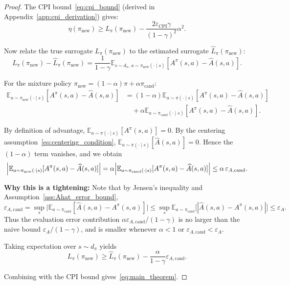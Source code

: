 \documentclass{article}
\theoremstyle{plain}
\theoremstyle{definition}
\theoremstyle{remark}
\newcommand{\E}{\mathbb{E}}
\begin{document}
\begin{proof}
The CPI bound~\eqref{eq:cpi_bound} (derived in Appendix~\ref{app:cpi_derivation}) gives:
\[
\eta(\pi_{\mathrm{new}}) \ge L_\pi(\pi_{\mathrm{new}}) - \frac{2\varepsilon_{\mathrm{CPI}}\gamma}{(1-\gamma)^2}\alpha^2.
\]

Now relate the true surrogate $L_\pi(\pi_{\mathrm{new}})$ to the estimated surrogate $\widehat{L}_\pi(\pi_{\mathrm{new}})$:
\[
L_\pi(\pi_{\mathrm{new}}) - \widehat{L}_\pi(\pi_{\mathrm{new}})
=
\frac{1}{1-\gamma}\E_{s\sim d_\pi,\, a\sim\pi_{\mathrm{new}}(\cdot\mid s)}\!\left[A^\pi(s,a) - \widehat{A}(s,a)\right].
\]

For the mixture policy $\pi_{\mathrm{new}}=(1-\alpha)\pi+\alpha\pi_{\mathrm{cand}}$:
\begin{align*}
\E_{a\sim\pi_{\mathrm{new}}(\cdot\mid s)}[A^\pi(s,a) - \widehat{A}(s,a)]
&=
(1-\alpha)\E_{a\sim\pi(\cdot\mid s)}[A^\pi(s,a) - \widehat{A}(s,a)] \\
&\quad + \alpha\E_{a\sim\pi_{\mathrm{cand}}(\cdot\mid s)}[A^\pi(s,a) - \widehat{A}(s,a)].
\end{align*}

By definition of advantage, $\E_{a\sim\pi(\cdot\mid s)}[A^\pi(s,a)]=0$.
By the centering assumption~\eqref{eq:centering_condition}, $\E_{a\sim\pi(\cdot\mid s)}[\widehat A(s,a)]=0$.
Hence the $(1-\alpha)$ term vanishes, and we obtain
\[
\Bigl|\E_{a\sim\pi_{\mathrm{new}}(\cdot\mid s)}[A^\pi(s,a) - \widehat{A}(s,a)]\Bigr|
=
\alpha\Bigl|\E_{a\sim\pi_{\mathrm{cand}}(\cdot\mid s)}[A^\pi(s,a) - \widehat{A}(s,a)]\Bigr|
\le \alpha\,\varepsilon_{A,\mathrm{cand}}.
\]

\textbf{Why this is a tightening:}
Note that by Jensen's inequality and Assumption~\ref{ass:Ahat_error_bound},
\[
\varepsilon_{A,\mathrm{cand}} 
= \sup_{s}\bigl|\E_{a\sim\pi_{\mathrm{cand}}}[\widehat{A}(s,a)-A^\pi(s,a)]\bigr|
\le \sup_{s}\E_{a\sim\pi_{\mathrm{cand}}}\bigl[|\widehat{A}(s,a)-A^\pi(s,a)|\bigr]
\le \varepsilon_A.
\]
Thus the evaluation error contribution $\alpha\varepsilon_{A,\mathrm{cand}}/(1-\gamma)$ is no larger than the naive bound $\varepsilon_A/(1-\gamma)$, and is smaller whenever $\alpha<1$ or $\varepsilon_{A,\mathrm{cand}}<\varepsilon_A$.

Taking expectation over $s\sim d_\pi$ yields
\[
L_\pi(\pi_{\mathrm{new}}) \ge \widehat{L}_\pi(\pi_{\mathrm{new}}) - \frac{\alpha}{1-\gamma}\varepsilon_{A,\mathrm{cand}}.
\]

Combining with the CPI bound gives~\eqref{eq:main_theorem}.
\end{proof}
\end{document}
